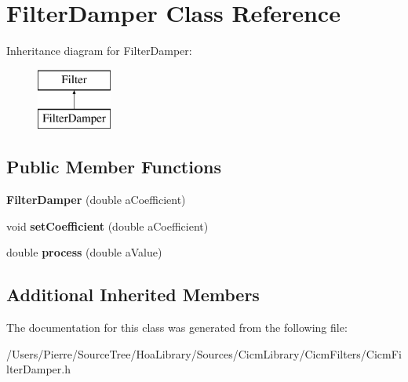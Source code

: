 \hypertarget{class_filter_damper}{\section{Filter\-Damper Class Reference}
\label{class_filter_damper}
}
Inheritance diagram for Filter\-Damper\-:\begin{figure}[H]
\begin{center}
\leavevmode
\includegraphics[height=2.000000cm]{class_filter_damper}
\end{center}
\end{figure}
\subsection*{Public Member Functions}
\begin{DoxyCompactItemize}
\item 
\hypertarget{class_filter_damper_a75d31eac4c4dbd76f219bc364813eb49}{{\bfseries Filter\-Damper} (double a\-Coefficient)}\label{class_filter_damper_a75d31eac4c4dbd76f219bc364813eb49}

\item 
\hypertarget{class_filter_damper_a922c331d030fbe87b8ce19b9c1796b89}{void {\bfseries set\-Coefficient} (double a\-Coefficient)}\label{class_filter_damper_a922c331d030fbe87b8ce19b9c1796b89}

\item 
\hypertarget{class_filter_damper_a02b1693d0ae4dfa481e46fe4b73915a2}{double {\bfseries process} (double a\-Value)}\label{class_filter_damper_a02b1693d0ae4dfa481e46fe4b73915a2}

\end{DoxyCompactItemize}
\subsection*{Additional Inherited Members}


The documentation for this class was generated from the following file\-:\begin{DoxyCompactItemize}
\item 
/\-Users/\-Pierre/\-Source\-Tree/\-Hoa\-Library/\-Sources/\-Cicm\-Library/\-Cicm\-Filters/Cicm\-Filter\-Damper.\-h\end{DoxyCompactItemize}
